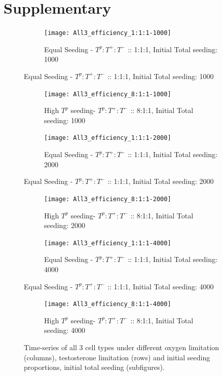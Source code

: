 \appendix
\chapter{Supplementary}

\begin{figure}[h!]
  \centering
  \begin{subfigure}[b]{\textwidth}
    \centering
    \texttt{[image: All3\_efficiency\_1:1:1-1000]}
    \caption{Equal Seeding - $T^p:T^+:T^-$ :: 1:1:1, Initial Total seeding: 1000}
    \label{fig_all3-time-series_1:1:1-1000}
  \end{subfigure}
\end{figure}
\begin{figure}[h!]\ContinuedFloat
  \centering
  \begin{subfigure}[b]{\textwidth}
    \centering
    \texttt{[image: All3\_efficiency\_8:1:1-1000]}
    \caption{High $T^p$ seeding- $T^p:T^+:T^-$ :: 8:1:1, Initial Total seeding: 1000}
    \label{fig_all3-time-series_8:1:1-1000}
  \end{subfigure}
  \begin{subfigure}[b]{\textwidth}
    \centering
    \texttt{[image: All3\_efficiency\_1:1:1-2000]}
    \caption{Equal Seeding - $T^p:T^+:T^-$ :: 1:1:1, Initial Total seeding: 2000}
    \label{fig_all3-time-series_1:1:1-2000}
  \end{subfigure}
\end{figure}
\begin{figure}[h!]\ContinuedFloat
  \centering
  \begin{subfigure}[b]{\textwidth}
    \centering
    \texttt{[image: All3\_efficiency\_8:1:1-2000]}
    \caption{High $T^p$ seeding- $T^p:T^+:T^-$ :: 8:1:1, Initial Total seeding: 2000}
    \label{fig_all3-time-series_8:1:1-2000}
  \end{subfigure}
  \begin{subfigure}[b]{\textwidth}
    \centering
    \texttt{[image: All3\_efficiency\_1:1:1-4000]}
    \caption{Equal Seeding - $T^p:T^+:T^-$ :: 1:1:1, Initial Total seeding: 4000}
    \label{fig_all3-time-series_1:1:1-4000}
  \end{subfigure}
\end{figure}
\begin{figure}[h!]\ContinuedFloat
  \centering
  \begin{subfigure}[b]{\textwidth}
    \centering
    \texttt{[image: All3\_efficiency\_8:1:1-4000]}
    \caption{High $T^p$ seeding- $T^p:T^+:T^-$ :: 8:1:1, Initial Total seeding: 4000}
    \label{fig_all3-time-series_8:1:1-4000}
  \end{subfigure}
  \caption[Time-series of all 3 cell types under different limitations]{Time-series of all 3 cell types under different oxygen limitation (columns), testosterone limitation (rows) and initial seeding proportions, initial total seeding (subfigures).}
  \label{fig_all3-time-series}
\end{figure}

